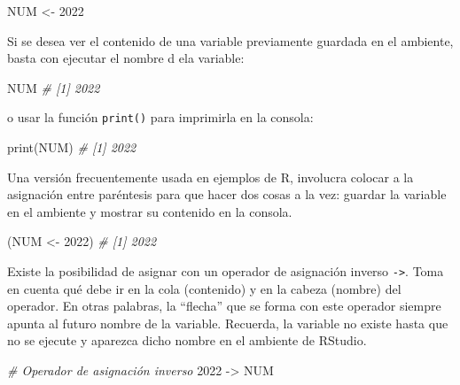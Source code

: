 \documentclass[
]{article}
\newenvironment{Shaded}{\begin{snugshade}}{\end{snugshade}}
\newcommand{\CommentTok}[1]{\textcolor[rgb]{0.56,0.35,0.01}{\textit{#1}}}
\newcommand{\DecValTok}[1]{\textcolor[rgb]{0.00,0.00,0.81}{#1}}
\newcommand{\FunctionTok}[1]{\textcolor[rgb]{0.00,0.00,0.00}{#1}}
\newcommand{\NormalTok}[1]{#1}
\newcommand{\OtherTok}[1]{\textcolor[rgb]{0.56,0.35,0.01}{#1}}
\theoremstyle{definition}
\theoremstyle{definition}
\theoremstyle{definition}
\theoremstyle{definition}
\theoremstyle{remark}
\begin{document}
\begin{Shaded}
\begin{Highlighting}[]
\NormalTok{NUM }\OtherTok{\textless{}{-}} \DecValTok{2022}
\end{Highlighting}
\end{Shaded}

Si se desea ver el contenido de una variable previamente guardada en el ambiente, basta con ejecutar el nombre d ela variable:

\begin{Shaded}
\begin{Highlighting}[]
\NormalTok{NUM}
\CommentTok{\# [1] 2022}
\end{Highlighting}
\end{Shaded}

o usar la función \texttt{print()} para imprimirla en la consola:

\begin{Shaded}
\begin{Highlighting}[]
\FunctionTok{print}\NormalTok{(NUM)}
\CommentTok{\# [1] 2022}
\end{Highlighting}
\end{Shaded}

Una versión frecuentemente usada en ejemplos de R, involucra colocar a la asignación entre paréntesis para que hacer dos cosas a la vez: guardar la variable en el ambiente y mostrar su contenido en la consola.

\begin{Shaded}
\begin{Highlighting}[]
\NormalTok{(NUM }\OtherTok{\textless{}{-}} \DecValTok{2022}\NormalTok{)}
\CommentTok{\# [1] 2022}
\end{Highlighting}
\end{Shaded}

Existe la posibilidad de asignar con un operador de asignación inverso \texttt{-\textgreater{}}. Toma en cuenta qué debe ir en la cola (contenido) y en la cabeza (nombre) del operador. En otras palabras, la ``flecha'' que se forma con este operador siempre apunta al futuro nombre de la variable. Recuerda, la variable no existe hasta que no se ejecute y aparezca dicho nombre en el ambiente de RStudio.

\begin{Shaded}
\begin{Highlighting}[]
\CommentTok{\# Operador de asignación inverso}
\DecValTok{2022} \OtherTok{{-}\textgreater{}}\NormalTok{ NUM}
\end{Highlighting}
\end{Shaded}
\end{document}

